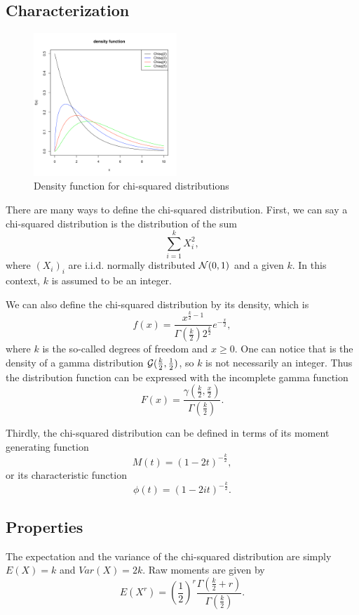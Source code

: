 \subsection{Characterization}
\begin{figure}
  \vspace{-20pt}
  \begin{center}
    \includegraphics[width=0.48\textwidth]{img/chisqzoom}
  \end{center}
  \vspace{-20pt}  
  \caption{Density function for chi-squared distributions}
\end{figure}
There are many ways to define the chi-squared distribution. First, we can say a chi-squared distribution is the distribution of the sum
$$
\sum_{i=1}^k X_i^2,
$$
where $(X_i)_i$ are i.i.d. normally distributed $\mathcal N(0,1)$ and a given $k$. In this context, $k$ is assumed to be an integer.

We can also define the chi-squared distribution by its density, which is
$$
f(x) = \frac{x^{\frac{k}{2}-1}}{\Gamma(\frac{k}{2}) 2^{\frac{k}{2}} }  e^{-\frac{x}{2} },  
$$
where $k$ is the so-called degrees of freedom and $x\geq 0$. One can notice that is the density of a gamma distribution $\mathcal G(\frac{k}{2},\frac{1}{2})$, so $k$ is not necessarily an integer. Thus the distribution function can be expressed with the incomplete gamma function
$$
F(x) = \frac{\gamma(\frac{k}{2},\frac{x}{2})}{\Gamma(\frac{k}{2})}. 
$$

Thirdly, the chi-squared distribution can be defined in terms of its moment generating function
$$
M(t) = (1-2t)^{-\frac{k}{2}},
$$
or its characteristic function
$$
\phi(t) =(1-2it)^{-\frac{k}{2}}.
$$ 

\subsection{Properties}
The expectation and the variance of the chi-squared distribution are simply
$E(X) = k $ and $Var(X)=2k$. Raw moments are given by
$$
E(X^r) =\left(\frac{1}{2}\right)^r\frac{\Gamma(\frac{k}{2}+r)}{\Gamma(\frac{k}{2})}.
$$


